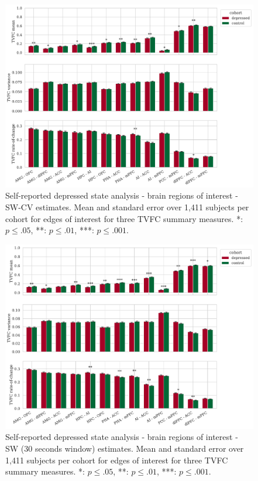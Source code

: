 \begin{figure}[h]
  \centering
  \includegraphics[width=\textwidth]{fig/ukbiobank/TVFC_predictions_summaries/self_reported_depression_state/cohort_comparison/ROI/correlation_all_TVFC_summary_measures_SW_cross_validated_edges_of_interest}
  \caption{
    Self-reported depressed state analysis - brain regions of interest - SW-CV estimates.
    Mean and standard error over 1,411 subjects per cohort for edges of interest for three TVFC summary measures.
    *: $p \leq .05$, **: $p \leq .01$, ***: $p \leq .001$.
  }\label{fig:ukb-results-srds-roi-cohort-comparison-edges-of-interest-sw-cv}
\end{figure}


\begin{figure}[h]
    \centering
    \includegraphics[width=\textwidth]{fig/ukbiobank/TVFC_predictions_summaries/self_reported_depression_state/cohort_comparison/ROI/correlation_all_TVFC_summary_measures_SW_30_edges_of_interest}
    \caption{
        Self-reported depressed state analysis - brain regions of interest - SW (30 seconds window) estimates.
        Mean and standard error over 1,411 subjects per cohort for edges of interest for three TVFC summary measures.
        *: $p \leq .05$, **: $p \leq .01$, ***: $p \leq .001$.
    }\label{fig:ukb-results-srds-roi-cohort-comparison-edges-of-interest-sw-30}
\end{figure}


